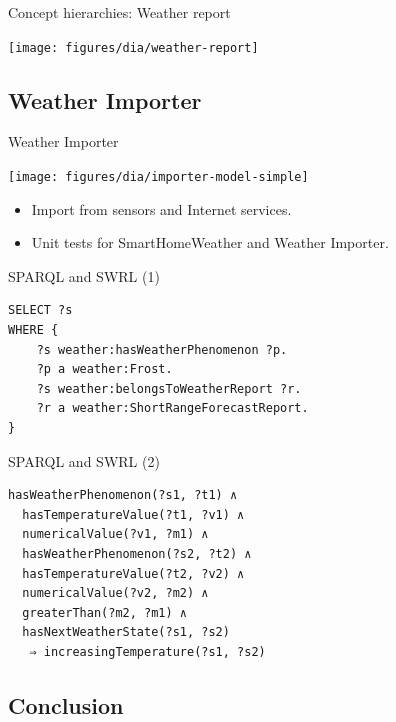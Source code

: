 \documentclass{beamer}
\begin{document}
\begin{frame}{Concept hierarchies: Weather report}
	\begin{center}
		\texttt{[image: figures/dia/weather-report]}
	\end{center}
\end{frame}

\subsection{Weather Importer}

\begin{frame}{Weather Importer}
	\begin{center}
		\texttt{[image: figures/dia/importer-model-simple]}
	\end{center}

	\begin{itemize}
		\item Import from sensors and Internet services.
		\item Unit tests for SmartHomeWeather and Weather Importer.
	\end{itemize}
\end{frame}

\begin{frame}[fragile]{SPARQL and SWRL (1)}
	\begin{framed}
		\begin{verbatim}
SELECT ?s
WHERE {
    ?s weather:hasWeatherPhenomenon ?p.
    ?p a weather:Frost.
    ?s weather:belongsToWeatherReport ?r.
    ?r a weather:ShortRangeForecastReport.
}
		\end{verbatim}
	\end{framed}
\end{frame}

\begin{frame}[fragile]{SPARQL and SWRL (2)}
	\begin{framed}
		\begin{verbatim}
hasWeatherPhenomenon(?s1, ?t1) ∧
  hasTemperatureValue(?t1, ?v1) ∧
  numericalValue(?v1, ?m1) ∧
  hasWeatherPhenomenon(?s2, ?t2) ∧
  hasTemperatureValue(?t2, ?v2) ∧
  numericalValue(?v2, ?m2) ∧
  greaterThan(?m2, ?m1) ∧
  hasNextWeatherState(?s1, ?s2)
   ⇒ increasingTemperature(?s1, ?s2)
		\end{verbatim}
	\end{framed}
\end{frame}

\subsection{Conclusion}
\end{document}
